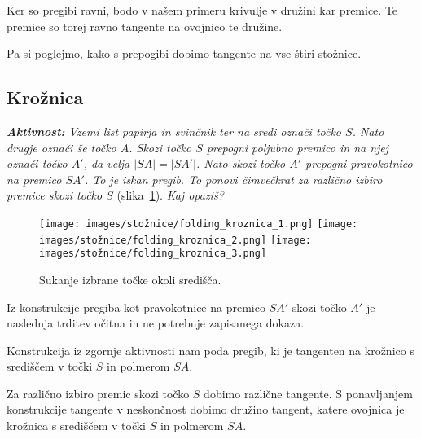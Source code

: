 \begin{opomba}
    Ker so pregibi ravni, bodo v našem primeru krivulje v družini kar premice. Te premice so torej ravno tangente na ovojnico te družine.
\end{opomba}

Pa si poglejmo, kako s prepogibi dobimo tangente na vse štiri stožnice.

\subsection{Krožnica}


\textit{\textbf{Aktivnost:} Vzemi list papirja in svinčnik ter na sredi označi točko $S$. Nato drugje označi še točko $A$. Skozi točko $S$ prepogni poljubno premico in na njej označi točko $A'$, da velja $|SA| = |SA'|$. Nato skozi točko $A'$ prepogni pravokotnico na premico $SA'$. To je iskan pregib. To ponovi čimvečkrat za različno izbiro premice skozi točko $S$} (slika~\ref{fig:koraki_kroznica}). \textit{Kaj opaziš?}

\begin{figure}[h]
    \centering
    \texttt{[image: images/stožnice/folding\_kroznica\_1.png]}
    \texttt{[image: images/stožnice/folding\_kroznica\_2.png]}
    \texttt{[image: images/stožnice/folding\_kroznica\_3.png]}
    \caption[Prepogibanje krožnice]{Sukanje izbrane točke okoli središča.}
    \label{fig:koraki_kroznica}
\end{figure}


Iz konstrukcije pregiba kot pravokotnice na premico $SA'$ skozi točko $A'$ je naslednja trditev očitna in ne potrebuje zapisanega dokaza.

\begin{trditev}
    Konstrukcija iz zgornje aktivnosti nam poda pregib, ki je tangenten na krožnico s središčem v točki $S$ in polmerom $SA$.
\end{trditev}

Za različno izbiro premic skozi točko $S$ dobimo različne tangente. S ponavljanjem konstrukcije tangente v neskončnost dobimo družino tangent, katere ovojnica je krožnica s središčem v točki $S$ in polmerom $SA$.

